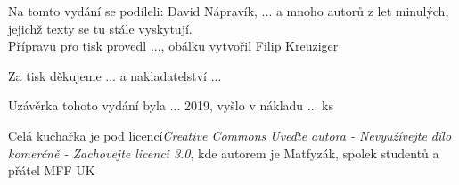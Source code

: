 \tableofcontents
{}
\vspace*{\fill}
\noindent Na tomto vydání se podíleli: David Nápravík, ... 
a mnoho autorů z let minulých, jejichž texty se tu stále vyskytují.
\\
Přípravu pro tisk provedl ..., obálku vytvořil Filip Kreuziger

Za tisk děkujeme ... a nakladatelství ...

Uzávěrka tohoto vydání byla ... 2019, vyšlo v nákladu ... ks

Celá kuchařka je pod licencí\textit{Creative Commons Uveďte autora -
Nevyužívejte dílo komerčně - Zachovejte licenci 3.0}, kde autorem je Matfyzák,
spolek studentů a přátel MFF UK
\newpage
{}